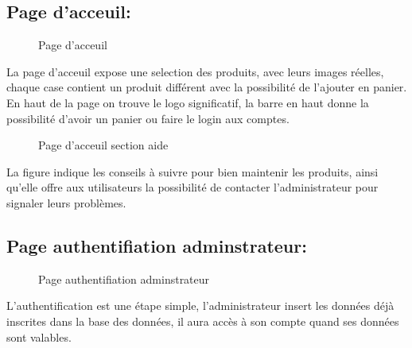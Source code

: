 \documentclass[a4paper]{report}
\begin{document}
\begin{doublespace}
\begin{doublespace}
\begin{doublespace}
\begin{doublespace}
\begin{doublespace}
\begin{doublespace}
                        \subsection{Page d'acceuil:}
                        \begin{figure}[H]
                            \begin{center}
                                \caption{Page d'acceuil}
                            \end{center}
                        \end{figure}
                        \newpage
                        La page d'acceuil expose une selection des produits, avec leurs images réelles, chaque case contient un produit différent avec la possibilité de l'ajouter en panier. En haut de la page on trouve le logo significatif, la barre en haut donne la possibilité d'avoir un panier ou faire le login aux comptes.
                        \begin{figure}[H]
                            \begin{center}
                                \caption{Page d'acceuil section aide }
                            \end{center}
                        \end{figure}
                        La figure indique les conseils à suivre pour bien maintenir les produits, ainsi qu'elle offre aux utilisateurs la possibilité de contacter l'administrateur pour signaler leurs problèmes.
                        \subsection{Page authentifiation adminstrateur:}
                        \begin{figure}[H]
                            \begin{center}
                                \caption{Page authentifiation adminstrateur}
                            \end{center}
                        \end{figure}
                        L’authentification est une étape simple, l'administrateur insert les données déjà inscrites dans la base des données, il aura accès à son compte quand ses données sont valables.

\end{doublespace}
\end{doublespace}
\end{doublespace}
\end{doublespace}
\end{doublespace}
\end{doublespace}
\end{document}
